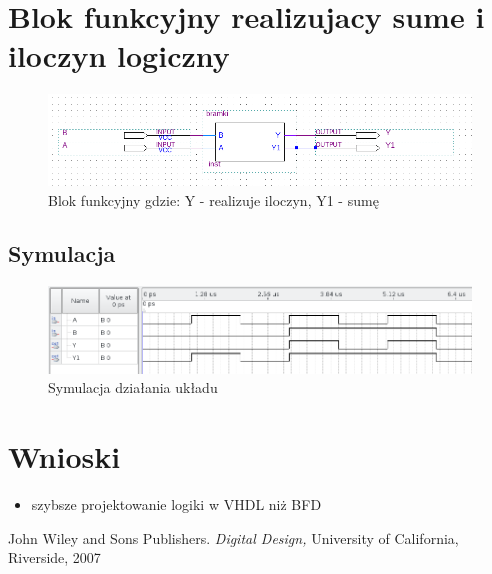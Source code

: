 \documentclass{classrep}
\begin{document}
\section{Blok funkcyjny realizujacy sume i iloczyn logiczny}

\begin{figure}[H]
\centering
\includegraphics[width=0.8\linewidth]{blokvramek}
\caption{Blok funkcyjny gdzie: Y - realizuje iloczyn, Y1 - sumę }
\label{fig:blokvramek}
\end{figure}

 \baselineskip


\subsection{Symulacja}
\begin{figure}[H]
\centering
\includegraphics[width=1.0\linewidth]{bramki}
\caption{Symulacja działania układu}
\label{fig:bramki}
\end{figure}

\section{Wnioski}
\begin{itemize}
	\item szybsze projektowanie logiki w VHDL niż BFD
\end{itemize}

\begin{thebibliography}{0}
   John Wiley and Sons Publishers.
    \textsl{Digital Design,} University of California, Riverside, 2007
\end{thebibliography}
\end{document}

